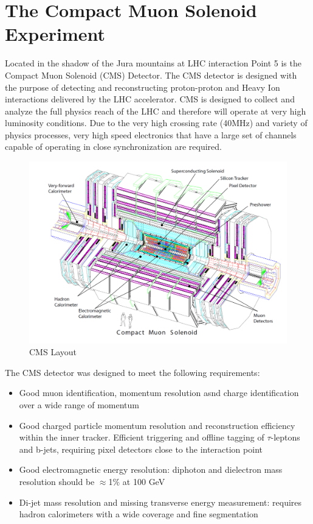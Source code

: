 \chapter{The Compact Muon Solenoid Experiment}
Located in the shadow of the Jura mountains
at LHC interaction Point 5 is the Compact Muon Solenoid (CMS) Detector. 
The CMS detector is designed with the purpose of detecting and reconstructing
proton-proton and Heavy Ion interactions delivered by the LHC accelerator.
CMS is designed to collect and analyze the full physics reach of the LHC and 
therefore will operate at very high luminosity conditions. Due to the very high
crossing rate (40MHz) and variety of physics processes, very high speed electronics
that have a large set of channels capable of operating in close synchronization are required.

\begin{figure}[t]
  \centering
	\includegraphics[width=1\textwidth]{images/CMSLayout.png}
  	\caption[CMS Layout]
   	{CMS Layout}
	\label{fig:CMSLayout}
\end{figure}
The CMS detector was designed to meet the following requirements:
\begin{itemize}
\item Good muon identification, momentum resolution asnd charge identification over a wide range of momentum 
\item Good charged particle momentum resolution and reconstruction efficiency within the inner tracker. Efficient
triggering and offline tagging of $\tau$-leptons and b-jets, requiring pixel detectors close to the interaction point
\item Good electromagnetic energy resolution: diphoton and dielectron mass resolution should
be $\approx$1$\%$ at 100 GeV
\item Di-jet mass resolution and missing transverse energy measurement: requires hadron
calorimeters with a wide coverage and fine segmentation
\end{itemize}

